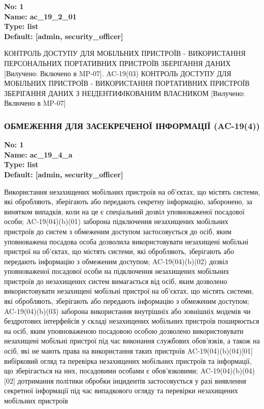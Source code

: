 \documentclass{article}
\begin{document}
\vspace{10pt}
{\footnotesize\bfseries
No: 1\\
Name: ac\_19\_2\_01\\
Type: list\\
Default: [\textquotedbl{}admin\textquotedbl{}, \textquotedbl{}security\_officer\textquotedbl{}]
}

{\footnotesize КОНТРОЛЬ ДОСТУПУ ДЛЯ МОБІЛЬНИХ ПРИСТРОЇВ - ВИКОРИСТАННЯ ПЕРСОНАЛЬНИХ ПОРТАТИВНИХ ПРИСТРОЇВ ЗБЕРІГАННЯ ДАНИХ [Вилучено: Включено в MP-07]. AC-19(03) КОНТРОЛЬ ДОСТУПУ ДЛЯ МОБІЛЬНИХ ПРИСТРОЇВ - ВИКОРИСТАННЯ ПОРТАТИВНИХ ПРИСТРОЇВ ЗБЕРІГАННЯ ДАНИХ З НЕІДЕНТИФІКОВАНИМ ВЛАСНИКОМ [Вилучено: Включено в MP-07]}




\subsubsection{ОБМЕЖЕННЯ ДЛЯ ЗАСЕКРЕЧЕНОЇ ІНФОРМАЦІЇ (AC-19(4))}


\vspace{10pt}
{\footnotesize\bfseries
No: 1\\
Name: ac\_19\_4\_a\\
Type: list\\
Default: [\textquotedbl{}admin\textquotedbl{}, \textquotedbl{}security\_officer\textquotedbl{}]
}

{\footnotesize Використання незахищених мобільних пристроїв на об'єктах, що містять системи, які обробляють, зберігають або передають секретну інформацію, заборонено, за винятком випадків, коли на це є спеціальний дозвіл уповноваженої посадової особи; AC-19(04)(b)(01) заборона підключення незахищених мобільних пристроїв до систем з обмеженим доступом застосовується до осіб, яким уповноважена посадова особа дозволила використовувати незахищені мобільні пристрої на об'єктах, що містять системи, які обробляють, зберігають або передають інформацію з обмеженим доступом; AC-19(04)(b)(02) дозвіл уповноваженої посадової особи на підключення незахищених мобільних пристроїв до незахищених систем вимагається від осіб, яким дозволено використовувати незахищені мобільні пристрої на об'єктах, що містять системи, які обробляють, зберігають або передають інформацію з обмеженим доступом; AC-19(04)(b)(03) заборона використання внутрішніх або зовнішніх модемів чи бездротових інтерфейсів у складі незахищених мобільних пристроїв поширюється на осіб, яким уповноваженою посадовою особою дозволено використовувати незахищені мобільні пристрої під час виконання службових обов'язків, а також на осіб, які не мають права на використання таких пристроїв AC-19(04)(b)(04)[01] вибірковий огляд та перевірка незахищених мобільних пристроїв та інформації, що зберігається на них, посадовими особами є обов'язковими; AC-19(04)(b)(04)[02] дотримання політики обробки інцидентів застосовується у разі виявлення секретної інформації під час випадкового огляду та перевірки незахищених мобільних пристроїв}
\end{document}
